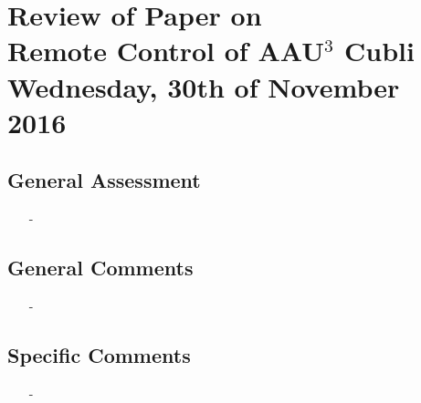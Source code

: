 
\renewcommand{\vec}[1]{\boldsymbol{\mathbf{#1}}}

\renewcommand\chaptername{KAPITEL}
\renewcommand\contentsname{Indhold}
\renewcommand\figurename{Figur}
\renewcommand\tablename{Tabel}

\section*{Review of Paper on\\
Remote Control of AAU$^3$ Cubli\\
\small Wednesday, 30th of November 2016}
\subsection{General Assessment}
\begin{itemize}
	\item[-]
\end{itemize}
\subsection{General Comments}
\begin{itemize}
	\item[-] 
\end{itemize}	
\subsection{Specific Comments}
\begin{itemize}
	\item[-]
\end{itemize}

